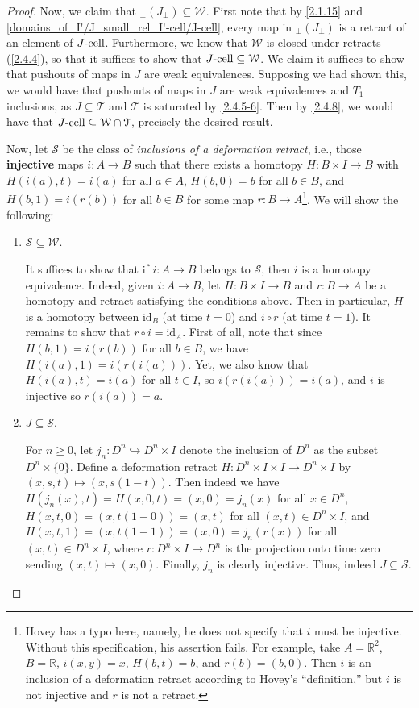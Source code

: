 \documentclass{amsart}
\theoremstyle{plain}
\theoremstyle{definition}
\newcommand{\sseq}{\subseteq}
\newcommand{\0}{\mathbf{0}}
\newcommand{\bR}{\mathbb{R}}
\newcommand{\id}{\mathrm{id}}
\newcommand{\p}{{_\perp}}
\newcommand{\into}{\hookrightarrow}
\newcommand{\cS}{\mathcal S}
\newcommand{\cT}{\mathcal T}
\newcommand{\cW}{\mathcal W}
\renewcommand{\(}{\left(}
\renewcommand{\)}{\right)}
\newcommand{\cell}{\text-\mathrm{cell}}
\begin{document}
\begin{proof}
  Now, we claim that $\p(J\p)\sseq\cW$. First note that by \autoref{2.1.15} and \autoref{domains_of_I'/J_small_rel_I'-cell/J-cell}, every map in $\p(J\p)$ is a retract of an element of $J\cell$. Furthermore, we know that $\cW$ is closed under retracts (\autoref{2.4.4}), so that it suffices to show that $J\cell\sseq\cW$. We claim it suffices to show that pushouts of maps in $J$ are weak equivalences. Supposing we had shown this, we would have that pushouts of maps in $J$ are weak equivalences and $T_1$ inclusions, as $J\sseq\cT$ and $\cT$ is saturated by \autoref{2.4.5-6}. Then by \autoref{2.4.8}, we would have that $J\cell\sseq\cW\cap\cT$, precisely the desired result.
  
  Now, let $\cS$ be the class of \textit{inclusions of a deformation retract}, i.e., those \textbf{injective} maps $i:A\to B$ such that there exists a homotopy $H:B\times I\to B$ with $H(i(a),t)=i(a)$ for all $a\in A$, $H(b,0)=b$ for all $b\in B$, and $H(b,1)=i(r(b))$ for all $b\in B$ for some map $r:B\to A$\footnote{Hovey has a typo here, namely, he does not specify that $i$ must be injective. Without this specification, his assertion fails. For example, take $A=\bR^2$, $B=\bR$, $i(x,y)=x$, $H(b,t)=b$, and $r(b)=(b,0)$. Then $i$ is an inclusion of a deformation retract according to Hovey's ``definition,'' but $i$ is not injective and $r$ is not a retract.}. We will show the following:
  \begin{enumerate}[listparindent=\parindent,parsep=0pt]
    \item $\cS\sseq\cW$.
    
    It suffices to show that if $i:A\to B$ belongs to $\cS$, then $i$ is a homotopy equivalence. Indeed, given $i:A\to B$, let $H:B\times I\to B$ and $r:B\to A$ be a homotopy and retract satisfying the conditions above. Then in particular, $H$ is a homotopy between $\id_B$ (at time $t=0$) and $i\circ r$ (at time $t=1$). It remains to show that $r\circ i=\id_A$. First of all, note that since $H(b,1)=i(r(b))$ for all $b\in B$, we have $H(i(a),1)=i(r(i(a)))$. Yet, we also know that $H(i(a),t)=i(a)$ for all $t\in I$, so $i(r(i(a)))=i(a)$, and $i$ is injective so $r(i(a))=a$.

    \item $J\sseq\cS$.
    
    For $n\geq0$, let $j_n:D^n\into D^n\times I$ denote the inclusion of $D^n$ as the subset $D^n\times\{0\}$. Define a deformation retract $H:D^n\times I\times I\to D^n\times I$ by $(x,s,t)\mapsto(x,s(1-t))$. Then indeed we have $H(j_n(x),t)=H(x,0,t)=(x,0)=j_n(x)$ for all $x\in D^n$, $H(x,t,0)=(x,t(1-0))=(x,t)$ for all $(x,t)\in D^n\times I$, and $H(x,t,1)=(x,t(1-1))=(x,0)=j_n(r(x))$ for all $(x,t)\in D^n\times I$, where $r:D^n\times I\to D^n$ is the projection onto time zero sending $(x,t)\mapsto(x,0)$. Finally, $j_n$ is clearly injective. Thus, indeed $J\sseq\cS$.


\end{enumerate}
\end{proof}
\end{document}
